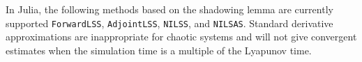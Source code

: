 
In Julia, the following methods based on the shadowing lemma are currently supported \texttt{ForwardLSS},  \texttt{AdjointLSS}, \texttt{NILSS}, and \texttt{NILSAS}. 
Standard derivative approximations are inappropriate for chaotic systems and will not give convergent estimates when the simulation time is a multiple of the Lyapunov time.